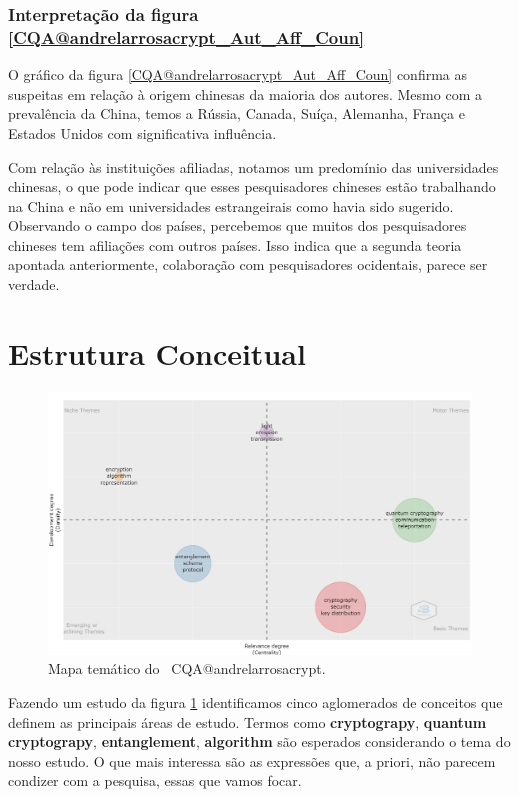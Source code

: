 \subsubsection{Interpretação da figura \ref{CQA@andrelarrosacrypt_Aut_Aff_Coun}}

O gráfico da figura \ref{CQA@andrelarrosacrypt_Aut_Aff_Coun} confirma as suspeitas em relação à origem chinesas da maioria dos autores. Mesmo com a prevalência da China, temos a Rússia, Canada, Suíça, Alemanha, França e Estados Unidos com significativa influência.

Com relação às instituições afiliadas, notamos um predomínio das universidades chinesas, o que pode indicar que esses pesquisadores chineses estão trabalhando na China e não em universidades estrangeirais como havia sido sugerido. Observando o campo dos países, percebemos que muitos dos pesquisadores chineses tem afiliações com outros países. Isso indica que a segunda teoria apontada anteriormente, colaboração com pesquisadores ocidentais, parece ser verdade.

\section{Estrutura Conceitual}

\begin{figure}
    \centering
    \includegraphics[angle=0,width=1\textwidth]{experiments/andrelarrosacrypt/AnaliseBibliometrica/CriptografiaQuantica/imagens/CQA@andrelarrosacrypt_MapaTematico.png}
    \caption{Mapa temático do \dataset\ CQA@andrelarrosacrypt.}
    \label{CQA@andrelarrosacrypt_MapaTematico}
\end{figure}

Fazendo um estudo da figura \ref{CQA@andrelarrosacrypt_MapaTematico} identificamos cinco aglomerados de conceitos que definem as principais áreas de estudo. Termos como \textbf{cryptograpy}, \textbf{quantum cryptograpy}, \textbf{entanglement}, \textbf{algorithm}  são esperados considerando o tema do nosso estudo. O que mais interessa são as expressões que, a priori, não parecem condizer com a pesquisa, essas que vamos focar.

